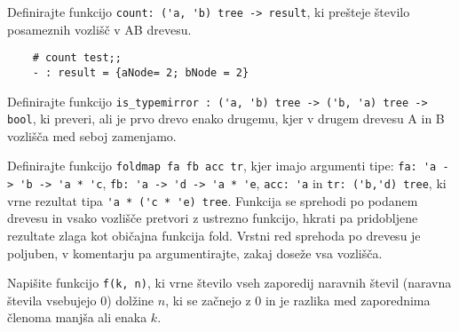 \documentclass[arhiv]{../izpit}
\begin{document}
	\podnaloga Definirajte funkcijo \verb|count: ('a, 'b) tree -> result|, ki prešteje število posameznih vozlišč v AB drevesu.
	\begin{verbatim}
	# count test;;	
	- : result = {aNode= 2; bNode = 2}
	\end{verbatim}
	
	\podnaloga Definirajte funkcijo \verb|is_typemirror : ('a, 'b) tree -> ('b, 'a) tree -> bool|, ki preveri, ali je prvo drevo enako drugemu, kjer v drugem drevesu A in B vozlišča med seboj zamenjamo.
	
	\podnaloga Definirajte funkcijo \verb|foldmap fa fb acc tr|, kjer imajo argumenti tipe: \verb|fa: 'a -> 'b -> 'a * 'c|, \verb|fb: 'a -> 'd -> 'a * 'e|, \verb|acc: 'a| in \verb|tr: ('b,'d) tree|, ki vrne rezultat tipa \verb|'a * ('c * 'e) tree|. Funkcija se sprehodi po podanem drevesu in vsako vozlišče pretvori z ustrezno funkcijo, hkrati pa pridobljene rezultate zlaga kot običajna funkcija fold. Vrstni red sprehoda po drevesu je poljuben, v komentarju pa argumentirajte, zakaj doseže vsa vozlišča.
	
	
  \naloga
  
  Napišite funkcijo \verb|f(k, n)|, ki vrne število vseh zaporedij naravnih števil (naravna števila vsebujejo 0) dolžine $n$, ki se začnejo z 0 in je razlika med zaporednima členoma manjša ali enaka $k$.
  
	
\end{document}
